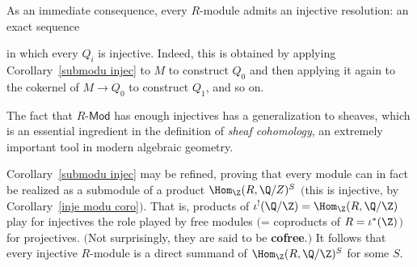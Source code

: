 As an immediate consequence, every $R$-module admits an injective resolution: an exact sequence

in which every $Q_i$ is injective. Indeed, this is obtained by applying Corollary~\ref{submodu injec} to $M$ to construct $Q_0$ and then applying it again to the cokernel of $M\to Q_0$ to construct $Q_1$, and so on.\par
The fact that $R$-$\mathsf{Mod}$ has enough injectives has a generalization to sheaves, which is an essential ingredient in the definition of \textit{sheaf cohomology}, an extremely important tool in modern algebraic geometry.
\begin{remark}
Corollary~\ref{submodu injec} may be refined, proving that every module can in fact be realized as a submodule of a product $\Hom_\Z(R,\Q/Z)^S$ $($this is injective, by Corollary~\ref{inje modu coro}$)$. That is, products of $\iota^!(\Q/\Z)=\Hom_\Z(R,\Q/\Z)$ play for injectives the role played by free modules $($= coproducts of $R=\iota^*(\Z)$$)$ for projectives. $($Not surprisingly, they are said to be \textbf{cofree}.$)$ It follows that every injective $R$-module is a direct summand of $\Hom_\Z(R,\Q/\Z)^S$ for some $S$.
\end{remark}

